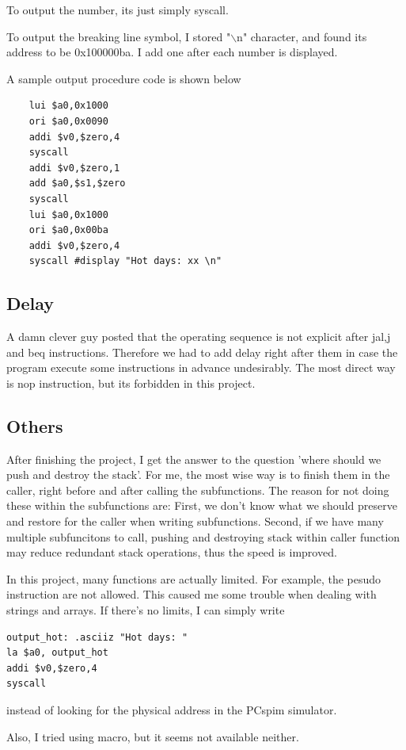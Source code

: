 \documentclass[a4paper,12pt]{article}
\begin{document}
\par To output the number, its just simply syscall.
\par To output the breaking line symbol, I stored "$\backslash$n" character, and found its address to be 0x100000ba. I add one after each number is displayed.

\par A sample output procedure code is shown below
\begin{lstlisting}
    lui $a0,0x1000
    ori $a0,0x0090
    addi $v0,$zero,4
    syscall
    addi $v0,$zero,1
    add $a0,$s1,$zero
    syscall
    lui $a0,0x1000
    ori $a0,0x00ba
    addi $v0,$zero,4
    syscall #display "Hot days: xx \n"
\end{lstlisting}

\subsection{Delay}
\par A damn clever guy posted that the operating sequence is not explicit after jal,j and beq instructions. Therefore we had to add delay right after them in case the program execute some instructions in advance undesirably. The most direct way is nop instruction, but its forbidden in this project.
\subsection{Others}
\par After finishing the project, I get the answer to the question 'where should we push and destroy the stack'. For me, the most wise way is to finish them in the caller, right before and after calling the subfunctions. The reason for not doing these within the subfunctions are: First, we don't know what we should preserve and restore for the caller when writing subfunctions. Second, if we have many multiple subfuncitons to call, pushing and destroying stack within caller function may reduce redundant stack operations, thus the speed is improved.
\par In this project, many functions are actually limited. For example, the pesudo instruction are not allowed. This caused me some trouble when dealing with strings and arrays. If there's no limits, I can simply write
\begin{lstlisting}
output_hot: .asciiz "Hot days: " 
la $a0, output_hot
addi $v0,$zero,4
syscall
\end{lstlisting}
instead of looking for the physical address in the PCspim simulator.
\par Also, I tried using macro, but it seems not available neither.
\end{document}
